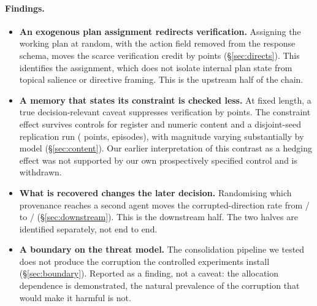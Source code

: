 \paragraph{Findings.}
\begin{itemize}\itemsep2pt
\item \textbf{An exogenous plan assignment redirects verification.} Assigning
the working plan at random, with the action field removed from the response
schema, moves the scarce verification credit by \SevenDelta{} points
(\S\ref{sec:directs}). This identifies the assignment, which does not isolate
internal plan state from topical salience or directive framing. This is the
upstream half of the chain.
\item \textbf{A memory that states its constraint is checked less.} At fixed
length, a true decision-relevant caveat suppresses verification by
\EightCaveatVsPadded{} points. The constraint effect survives controls for register and numeric content and a disjoint-seed replication run (\TenPooled{} points, \TenContrastN{} episodes), with magnitude varying substantially by
model (\S\ref{sec:content}). Our earlier interpretation of this contrast as a
hedging effect was not supported by our own prospectively specified control
and is withdrawn.
\item \textbf{What is recovered changes the later decision.} Randomising which
provenance reaches a second agent moves the corrupted-direction rate from
\ThreeBOthK/\ThreeBOthN{} to \ThreeBTgtK/\ThreeBTgtN{}
(\S\ref{sec:downstream}). This is the downstream half. The two halves are
identified separately, not end to end.
\item \textbf{A boundary on the threat model.} The consolidation pipeline we
tested does not produce the corruption the controlled experiments install
(\S\ref{sec:boundary}). Reported as a finding, not a caveat: the allocation
dependence is demonstrated, the natural prevalence of the corruption that would
make it harmful is not.
\end{itemize}

